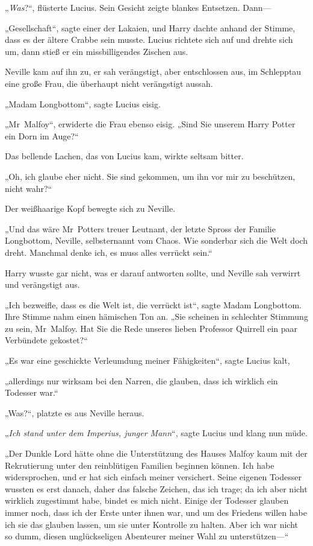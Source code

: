 {„\emph{Was}?“, flüsterte Lucius. Sein Gesicht zeigte blankes Entsetzen. Dann—

„Gesellschaft“, sagte einer der Lakaien, und Harry dachte anhand der Stimme, dass es der ältere Crabbe sein musste. Lucius richtete sich auf und drehte sich um, dann stieß er ein missbilligendes Zischen aus.

Neville kam auf ihn zu, er sah verängstigt, aber entschlossen aus, im Schlepptau eine große Frau, die überhaupt nicht verängstigt aussah.

„Madam Longbottom“, sagte Lucius eisig.

„Mr~Malfoy“, erwiderte die Frau ebenso eisig. „Sind Sie unserem Harry Potter ein Dorn im Auge?“

Das bellende Lachen, das von Lucius kam, wirkte seltsam bitter.

„Oh, ich glaube eher nicht. Sie sind gekommen, um ihn vor mir zu beschützen, nicht wahr?“

Der weißhaarige Kopf bewegte sich zu Neville.

„Und das wäre Mr~Potters treuer Leutnant, der letzte Spross der Familie Longbottom, Neville, selbsternannt vom Chaos. Wie sonderbar sich die Welt doch dreht. Manchmal denke ich, es muss alles verrückt sein.“

Harry wusste gar nicht, was er darauf antworten sollte, und Neville sah verwirrt und verängstigt aus.

„Ich bezweifle, dass es die Welt ist, die verrückt ist“, sagte Madam Longbottom. Ihre Stimme nahm einen hämischen Ton an. „Sie scheinen in schlechter Stimmung zu sein, Mr~Malfoy. Hat Sie die Rede unseres lieben Professor Quirrell ein paar Verbündete gekostet?“

„Es war eine geschickte Verleumdung meiner Fähigkeiten“, sagte Lucius kalt,

„allerdings nur wirksam bei den Narren, die glauben, dass ich wirklich ein Todesser war.“

„Was?“, platzte es aus Neville heraus.

„\emph{Ich stand unter dem Imperius, junger Mann}“, sagte Lucius und klang nun müde.

„Der Dunkle Lord hätte ohne die Unterstützung des Hauses Malfoy kaum mit der Rekrutierung unter den reinblütigen Familien beginnen können. Ich habe widersprochen, und er hat sich einfach meiner versichert. Seine eigenen Todesser wussten es erst danach, daher das falsche Zeichen, das ich trage; da ich aber nicht wirklich zugestimmt habe, bindet es mich nicht. Einige der Todesser glauben immer noch, dass ich der Erste unter ihnen war, und um des Friedens willen habe ich sie das glauben lassen, um sie unter Kontrolle zu halten. Aber ich war nicht so dumm, diesen unglückseligen Abenteurer meiner Wahl zu unterstützen—“

}
